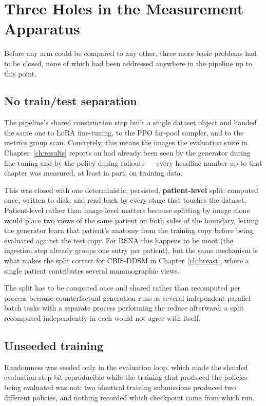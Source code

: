 \section{Three Holes in the Measurement Apparatus}
\label{sec:threeholes}

Before any arm could be compared to any other, three more basic problems
had to be closed, none of which had been addressed anywhere in the pipeline
up to this point.

\subsection{No train/test separation}

The pipeline's shared construction step built a single dataset object and
handed the same one to LoRA fine-tuning, to the PPO far-pool sampler, and
to the metrics group scan. Concretely, this means the images the
evaluation suite in Chapter~\ref{ch:results} reports on had already been
seen by the generator during fine-tuning and by the policy during
rollouts --- every headline number up to that chapter was measured, at
least in part, on training data.

This was closed with one deterministic, persisted, \textbf{patient-level}
split: computed once, written to disk, and read back by every stage that
touches the dataset. Patient-level rather than image-level matters
because splitting by image alone would place two views of the same
patient on both sides of the boundary, letting the generator learn that
patient's anatomy from the training copy before being evaluated against
the test copy. For RSNA this happens to be moot (the ingestion step
already groups one entry per patient), but the same mechanism is what
makes the split correct for CBIS-DDSM in Chapter~\ref{ch:breast}, where a
single patient contributes several mammographic views.

The split has to be computed once and shared rather than recomputed per
process because counterfactual generation runs as several independent
parallel batch tasks with a separate process performing the reduce
afterward; a split recomputed independently in each would not agree with
itself.

\subsection{Unseeded training}

Randomness was seeded only in the evaluation loop, which made the
sharded evaluation step bit-reproducible while the training that produced
the policies being evaluated was not: two identical training submissions
produced two different policies, and nothing recorded which checkpoint
came from which run.

